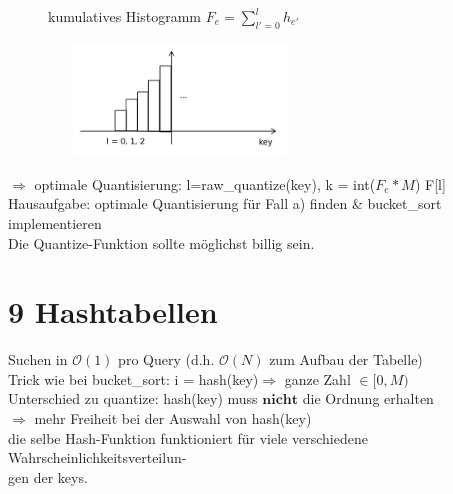 \documentclass[11pt, fleqn]{scrreprt}
\begin{document}
\begin {enumerate}
		\begin{figure}[htbp]
			\begin{minipage}[t]{10cm}
				\centering
				\vspace{-1cm}
				kumulatives Histogramm $F_e = \sum_{l' = 0}^{l} h_{e'}$ \\
			\end{minipage}
			\begin{minipage}[t]{6cm}
				\hspace*{-1cm}\includegraphics[width=7cm,height=3cm,keepaspectratio]{./Pictures/Balken2.png}\\
			\end{minipage}
		\end{figure}
	
		
		$\Rightarrow$ optimale Quantisierung: \hspace*{5mm} l=raw\_quantize(key), 
		k = int($F_e * M$)\hspace*{5mm}  F[l] \\
		
		Hausaufgabe: optimale Quantisierung für Fall a) finden \& bucket\_sort implementieren \\
		Die Quantize-Funktion sollte möglichst billig sein.
\end{enumerate} 

\chapter*{9 Hashtabellen}
Suchen in $\mathcal{O}(1)$ pro Query (d.h. $\mathcal{O}(N)$ zum Aufbau der Tabelle) \\

Trick wie bei bucket\_sort: i = hash(key)$\Rightarrow$ ganze Zahl $\in [0,M)$ \\
\hspace*{5mm} Unterschied zu quantize: hash(key) muss $\textbf{nicht}$ die Ordnung erhalten\\
\hspace*{10mm} $\Rightarrow$ mehr Freiheit bei der Auswahl von hash(key)\\
\hspace*{15mm} die selbe Hash-Funktion funktioniert für viele verschiedene Wahrscheinlichkeitsverteilun- \\
\hspace*{15mm} gen der keys.\\
\end{document}
